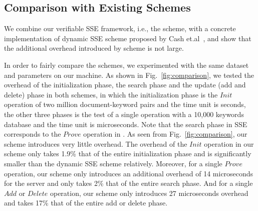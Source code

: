 
\subsection{Comparison with Existing Schemes}
We combine our verifiable SSE framework, i.e., the \name scheme, with a concrete implementation of dynamic SSE scheme proposed by Cash et.al~\cite{cash2014dynamic}, and show that the additional overhead introduced by \name scheme is not large.

In order to fairly compare the schemes, we experimented with the same dataset and parameters on our machine. As shown in Fig.~\ref{fig:comparison}, we tested the overhead of the initialization phase, the search phase and the update (add and delete) phase in both schemes, in which the initialization phase is the $Init$ operation of two million document-keyword pairs and the time unit is seconds, the other three phases is the test of a single operation with a 10,000 keywords database and the time unit is microseconds. Note that the search phase in SSE corresponds to the $Prove$ operation in \name. As seen from Fig.~\ref{fig:comparison}, our \name scheme introduces very little overhead. The overhead of the $Init$ operation in our scheme only takes 1.9\% that of the entire initialization phase and is significantly smaller than the dynamic SSE scheme relatively. Moreover, for a single $Prove$ operation, our \name scheme only introduces an additional overhead of 14 microseconds for the server and only takes 2\% that of the entire search phase. And for a single $Add$ or $Delete$ operation, our \name scheme only introduces 27 microseconds overhead and takes 17\% that of the entire add or delete phase.

